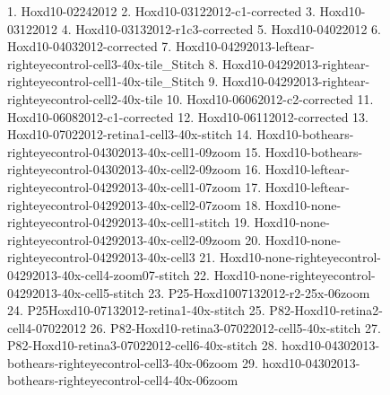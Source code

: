 \documentclass{article}
\begin{document}
\clearpage

\begin{figure}
  \centering
  \caption{1. Hoxd10-02242012
2. Hoxd10-03122012-c1-corrected
3. Hoxd10-03122012
4. Hoxd10-03132012-r1c3-corrected
5. Hoxd10-04022012
6. Hoxd10-04032012-corrected
7. Hoxd10-04292013-leftear-righteyecontrol-cell3-40x-tile_Stitch
8. Hoxd10-04292013-rightear-righteyecontrol-cell1-40x-tile_Stitch
9. Hoxd10-04292013-rightear-righteyecontrol-cell2-40x-tile
10. Hoxd10-06062012-c2-corrected
11. Hoxd10-06082012-c1-corrected
12. Hoxd10-06112012-corrected
13. Hoxd10-07022012-retina1-cell3-40x-stitch
14. Hoxd10-bothears-righteyecontrol-04302013-40x-cell1-09zoom
15. Hoxd10-bothears-righteyecontrol-04302013-40x-cell2-09zoom
16. Hoxd10-leftear-righteyecontrol-04292013-40x-cell1-07zoom
17. Hoxd10-leftear-righteyecontrol-04292013-40x-cell2-07zoom
18. Hoxd10-none-righteyecontrol-04292013-40x-cell1-stitch
19. Hoxd10-none-righteyecontrol-04292013-40x-cell2-09zoom
20. Hoxd10-none-righteyecontrol-04292013-40x-cell3
21. Hoxd10-none-righteyecontrol-04292013-40x-cell4-zoom07-stitch
22. Hoxd10-none-righteyecontrol-04292013-40x-cell5-stitch
23. P25-Hoxd1007132012-r2-25x-06zoom
24. P25Hoxd10-07132012-retina1-40x-stitch
25. P82-Hoxd10-retina2-cell4-07022012
26. P82-Hoxd10-retina3-07022012-cell5-40x-stitch
27. P82-Hoxd10-retina3-07022012-cell6-40x-stitch
28. hoxd10-04302013-bothears-righteyecontrol-cell3-40x-06zoom
29. hoxd10-04302013-bothears-righteyecontrol-cell4-40x-06zoom}
\end{figure}
\end{document}
